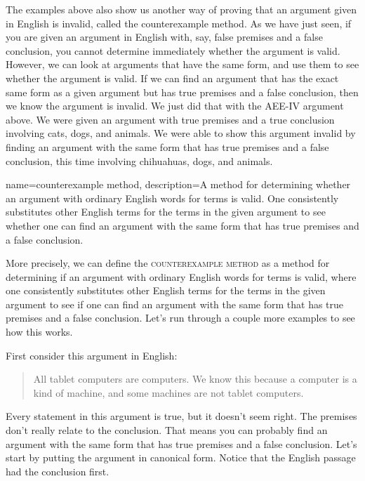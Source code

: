 {The examples above also show us another way of proving that an argument given in English is invalid, called the counterexample method. As we have just seen, if you are given an argument in English with, say, false premises and a false conclusion, you cannot determine immediately whether the argument is valid. However, we can look at arguments that have the same form, and use them to see whether the argument is valid. If we can find an argument that has the exact same form as a given argument but has true premises and a false conclusion, then we know the argument is invalid. We just did that with the AEE-IV argument above. We were given an argument with true premises and a true conclusion involving cats, dogs, and animals. We were able to show this argument invalid by finding an argument with the same form that has true premises and a false conclusion, this time involving chihuahuas, dogs, and animals. 


{
name=counterexample method,
description={A method for determining whether an argument with ordinary English words for terms is valid. One consistently substitutes other English terms for the terms in the given argument to see whether one can find an argument with the same form that has true premises and a false conclusion.}
}

More precisely, we can define the \textsc{\gls{counterexample method}} \label{def:counter_example_method} as a method for determining if an argument with ordinary English words for terms is valid, where one consistently substitutes other English terms for the terms in the given argument to see if one can find an argument with the same form that has true premises and a false conclusion. Let's run through a couple more examples to see how this works. 

First consider this argument in English:

\begin{quotation}
\noindent  All tablet computers are computers. We know this because a computer is a kind of machine, and some machines are not tablet computers. 
\end{quotation}

Every statement in this argument is true, but it doesn't seem right. The premises don't really relate to the conclusion. That means you can probably find an argument with the same form that has true premises and a false conclusion. Let's start by putting the argument in canonical form. Notice that the English passage had the conclusion first. 

}
